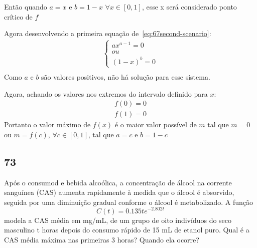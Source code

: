  Então quando $a=x$ e $b=1-x$ $\forall x\in[0, 1]$, esse x será considerado ponto crítico de $f$

 Agora desenvolvendo a primeira equação de~\ref{eq:67second-scenario}:
 \begin{equation}
    \begin{split}
        \left\{
            \begin{aligned}
                ax^{a-1}=0 \\
                ou \\
                (1-x)^b=0
            \end{aligned}
        \right. \\
    \end{split} 
 \end{equation}
 Como $a$ e $b$ são valores positivos, não há solução para esse sistema.
 
 Agora, achando os valores nos extremos do intervalo definido para $x$:
\begin{equation}
    \begin{split}
        f(0) = 0 \\
        f(1) = 0
    \end{split}
\end{equation}
Portanto o valor máximo de $f(x)$ é o maior valor possível de $m$ tal que $m=0$ ou $m=f(c)$, $\forall c\in [0,1]$, tal que $a=c$ e $b=1-c$

\subsection{73}
Após o consumod e bebida alcoólica, a concentração de álcool na corrente sanguínea (CAS) aumenta rapidamente à medida que o álcool é absorvido, seguida por uma diminuição gradual conforme o álcool é metabolizado. A função
\begin{equation}
    C(t) = 0.135te^{-2.802t}
\end{equation}
modela a CAS média em mg/mL, de um grupo de oito indivíduos do seco masculino t horas depois do consumo rápido de 15 mL de etanol puro. Qual é a CAS média máxima nas primeiras 3 horas? Quando ela ocorre?

